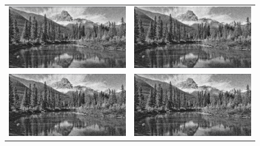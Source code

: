 		
	\begin{landscape}
		\hfill\break
		\hfill\break
		\hfill\break
		\begin{figure}[!h]
			\begin{tabular}{cc}
				\includegraphics[width=12.25cm]{Imagenes/Ruido_Gauss_5_50_FMA_5.png} & \includegraphics[width=12.25cm]{Imagenes/Ruido_Gauss_5_50_Gauss_5_5.png} \\
				\includegraphics[width=12.25cm]{Imagenes/Ruido_Gauss_5_50_FMA_3.png} & \includegraphics[width=12.25cm]{Imagenes/Ruido_Gauss_5_50_Gauss_5_3.png}

\end{tabular}
\end{figure}
\end{landscape}
